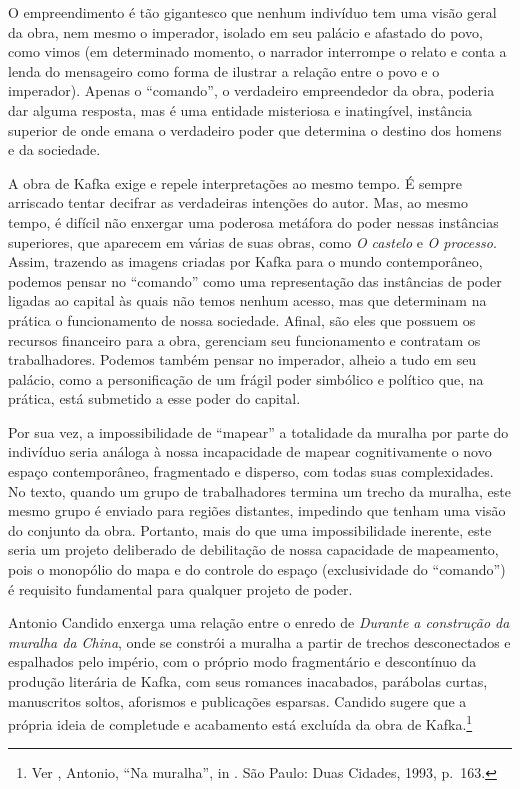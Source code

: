 O empreendimento é tão gigantesco que nenhum indivíduo tem uma visão
geral da obra, nem mesmo o imperador, isolado em seu palácio e afastado
do povo, como vimos (em determinado momento, o narrador interrompe o
relato e conta a lenda do mensageiro como forma de ilustrar a relação
entre o povo e o imperador). Apenas o ``comando'', o verdadeiro
empreendedor da obra, poderia dar alguma resposta, mas é uma entidade
misteriosa e inatingível, instância superior de onde emana o verdadeiro
poder que determina o destino dos homens e da sociedade.

A obra de Kafka exige e repele interpretações ao mesmo tempo. É sempre
arriscado tentar decifrar as verdadeiras intenções do autor. Mas, ao
mesmo tempo, é difícil não enxergar uma poderosa metáfora do poder
nessas instâncias superiores, que aparecem em várias de suas obras, como
\emph{O castelo} e \emph{O processo}. Assim, trazendo as imagens criadas
por Kafka para o mundo contemporâneo, podemos pensar no ``comando'' como
uma representação das instâncias de poder ligadas ao capital às quais
não temos nenhum acesso, mas que determinam na prática o funcionamento
de nossa sociedade. Afinal, são eles que possuem os recursos financeiro
para a obra, gerenciam seu funcionamento e contratam os trabalhadores.
Podemos também pensar no imperador, alheio a tudo em seu palácio, como a
personificação de um frágil poder simbólico e político que, na prática,
está submetido a esse poder do capital.

Por sua vez, a impossibilidade de ``mapear'' a totalidade da muralha por
parte do indivíduo seria análoga à nossa incapacidade de mapear
cognitivamente o novo espaço contemporâneo, fragmentado e disperso, com
todas suas complexidades. No texto, quando um grupo de trabalhadores
termina um trecho da muralha, este mesmo grupo é enviado para regiões
distantes, impedindo que tenham uma visão do conjunto da obra. Portanto,
mais do que uma impossibilidade inerente, este seria um projeto
deliberado de debilitação de nossa capacidade de mapeamento, pois o
monopólio do mapa e do controle do espaço (exclusividade do ``comando'')
é requisito fundamental para qualquer projeto de poder.

Antonio Candido enxerga uma relação entre o enredo de \emph{Durante a
construção da muralha da China}, onde se constrói a muralha a partir de
trechos desconectados e espalhados pelo império, com o próprio modo
fragmentário e descontínuo da produção literária de Kafka, com seus
romances inacabados, parábolas curtas, manuscritos soltos, aforismos e
publicações esparsas. Candido sugere que a própria ideia de completude e
acabamento está excluída da obra de Kafka.\footnote{Ver ,
  Antonio, ``Na muralha'', in {}. São Paulo:
  Duas Cidades, 1993, p.~163.}

